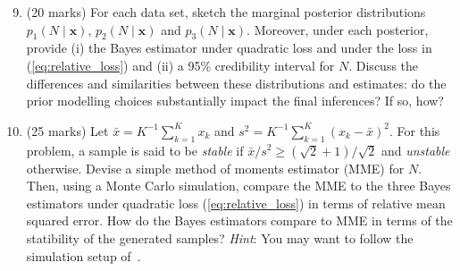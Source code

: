 \documentclass[a4paper,10pt, notitlepage]{report}
\begin{document}
\begin{enumerate}[label=\alph*)]
\setcounter{enumi}{8}
 \item (20 marks) For each data set, sketch the marginal posterior distributions $p_1(N \mid \boldsymbol{x})$, $p_2(N \mid \boldsymbol{x})$ and $p_3(N \mid \boldsymbol{x})$.
 Moreover, under each posterior,  provide (i) the Bayes estimator under quadratic loss and under the loss in (\ref{eq:relative_loss}) and (ii) a 95\% credibility interval for $N$.
 Discuss the differences and similarities between these distributions and estimates: do the prior modelling choices substantially impact the final inferences? If so, how?
 \item (25 marks) Let $\bar{x} = K^{-1}\sum_{k =1}^K x_k$ and $s^2 = K^{-1}\sum_{k =1}^K (x_k-\bar{x})^2$.
 For this problem, a sample is said to be \textit{stable} if $\bar{x}/s^2 \geq (\sqrt{2} + 1)/\sqrt{2}$ and \textit{unstable} otherwise.
 Devise a simple method of moments estimator (MME) for $N$.
 Then, using a Monte Carlo simulation, compare the MME to the three Bayes estimators under quadratic loss (\ref{eq:relative_loss}) in terms of relative mean squared error. 
 How do the Bayes estimators compare to MME in terms of the statibility of the generated samples? 
 \textit{Hint}: You may want to follow the simulation setup of~\cite{Carroll1985}. 
\end{enumerate}



\end{document}
